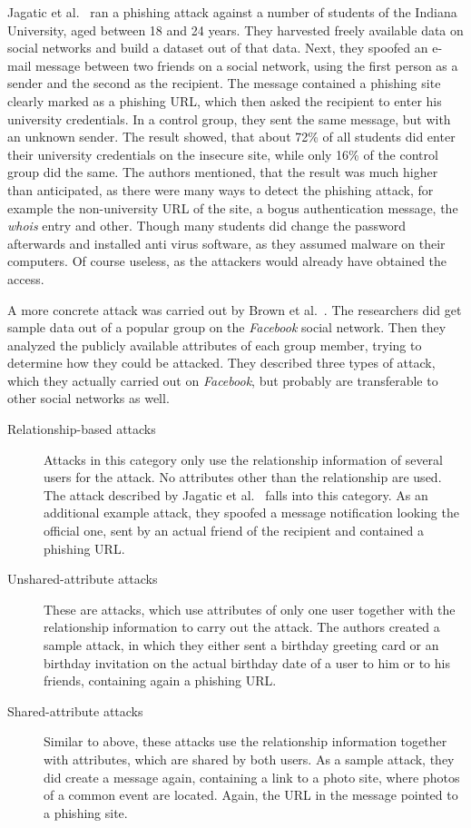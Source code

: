 Jagatic et al.~\cite{jagatic2007} ran a phishing attack against a number of
students of the Indiana University, aged between 18 and 24 years. They
harvested freely available data on social networks and build a dataset out of
that data. Next, they spoofed an e-mail message between two friends on a social
network, using the first person as a sender and the second as the recipient.
The message contained a phishing site clearly marked as a phishing URL, which
then asked the recipient to enter his university credentials. In a control
group, they sent the same message, but with an unknown sender. The result
showed, that about 72\% of all students did enter their university credentials
on the insecure site, while only 16\% of the control group did the same. The
authors mentioned, that the result was much higher than anticipated, as there
were many ways to detect the phishing attack, for example the non-university
URL of the site, a bogus authentication message, the \textit{whois} entry and
other. Though many students did change the password afterwards and installed
anti virus software, as they assumed malware on their computers. Of course
useless, as the attackers would already have obtained the access.

A more concrete attack was carried out by Brown et al.~\cite{brown2008}. The
researchers did get sample data out of a popular group on the \textit{Facebook}
social network. Then they analyzed the publicly available attributes of each
group member, trying to determine how they could be attacked. They described
three types of attack, which they actually carried out on \textit{Facebook},
but probably are transferable to other social networks as well. 

\begin{description}
\item[Relationship-based attacks]
Attacks in this category only use the relationship information of several
users for the attack. No attributes other than the relationship are used. The
attack described by Jagatic et al.~\cite{jagatic2007} falls into this category. As an
additional example attack, they spoofed a message notification looking the
official one, sent by an actual friend of the recipient and contained a
phishing URL.

\item[Unshared-attribute attacks]
These are attacks, which use attributes of only one user together
with the relationship information to carry out the attack. The authors created
a sample attack, in which they either sent a birthday greeting card or an
birthday invitation on the actual birthday date of a user to him or to his
friends, containing again a phishing URL.

\item[Shared-attribute attacks]
Similar to above, these attacks use the relationship information together with
attributes, which are shared by both users. As a sample attack, they did create
a message again, containing a link to a photo site, where photos of a common
event are located. Again, the URL in the message pointed to a phishing site.
\end{description}

